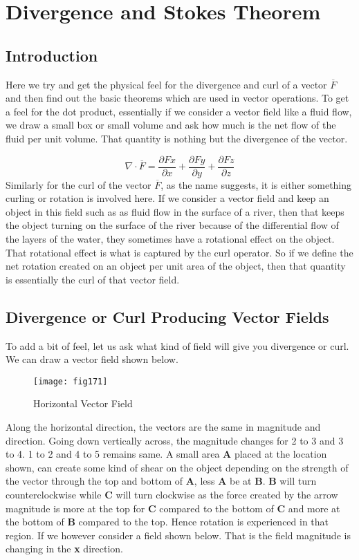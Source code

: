 \chapter{Divergence and Stokes Theorem}
	\section{Introduction}
	Here we try and get the physical feel for the divergence and curl of a vector $\overline{F}$  and then find out the basic theorems which are used in vector operations.
	To get a feel for the dot product, essentially if we consider a vector field like a fluid flow, we draw a small box or small volume and ask how much is the net flow of the fluid per unit volume. That quantity is nothing but the divergence of the vector.
	
\begin{equation}
\nabla\cdot \overline{F} = \frac{\partial Fx}{\partial x} + \frac{\partial Fy}{\partial y} + \frac{\partial Fz}{\partial z}	
\end{equation}
Similarly for the curl of the vector $\overline{F}$, as the name suggests, it is either something curling or rotation is involved here. If we consider a vector field and keep an object in this field such as as fluid flow in the surface of a river, then that keeps the object turning on the surface of the river because of the differential flow of the layers of the water, they sometimes have a rotational effect on the object. That rotational effect is what is captured by the curl operator. So if we define the net rotation created on an object per unit area of the object, then that quantity is essentially the curl of that vector field.
\section{Divergence or Curl Producing Vector Fields}
To add a bit of feel, let us ask what kind of field will give you divergence or curl. We can draw a vector field shown below.
\begin{figure}
	\centering
	\texttt{[image: fig171]}
	\caption{Horizontal Vector Field}
	
\end{figure}


 Along the horizontal direction, the vectors are the same in magnitude and direction. Going down vertically across, the magnitude changes for 2 to 3 and 3 to 4. 1 to 2 and 4 to 5 remains same. A small area \textbf{A} placed at the location shown, can create some kind of shear on the object depending on the strength of the vector through the top and bottom of \textbf{A}, less \textbf{A} be at \textbf{B}. \textbf{B} will turn counterclockwise while \textbf{C} will turn clockwise as the force created by the arrow magnitude is more at the top for \textbf{C} compared to the bottom of \textbf{C} and more at the bottom of \textbf{B} compared to the top. Hence rotation is experienced in that region. If we however consider a field shown below. That is the field magnitude is changing in the \textbf{x} direction.\\
 
